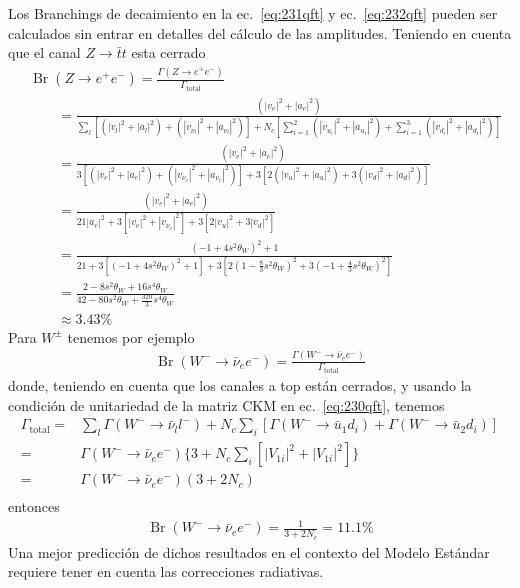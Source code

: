 Los Branchings de decaimiento en la ec.~\eqref{eq:231qft} y ec.~\eqref{eq:232qft}  pueden ser calculados sin entrar en detalles del cálculo de las amplitudes. Teniendo en cuenta que el canal $Z\to\bar{t}t$ esta cerrado
\begin{align}
  &\operatorname{Br}(Z\to e^+e^-)=\frac{\Gamma(Z\to e^+e^-)}{\Gamma_{\text{total}}}\nonumber\\
 &\qquad=\frac{(|v_e|^2+|a_e|^2)}{\sum_l[(|v_l|^2+|a_l|^2)+(|v_{\nu_l}|^2+|a_{\nu_l}|^2)]
+N_c[\sum_{i=1}^2(|v_{u_i}|^2+|a_{u_i}|^2)+\sum_{i=1}^3(|v_{d_i}|^2+|a_{d_i}|^2)]}\nonumber\\
 &\qquad=\frac{(|v_e|^2+|a_e|^2)}{3[(|v_e|^2+|a_e|^2)+(|v_{\nu_e}|^2+|a_{\nu_e}|^2)]
+3[2(|v_{u}|^2+|a_{u}|^2)+3(|v_{d}|^2+|a_{d}|^2)]}\nonumber\\
  &\qquad=\frac{(|v_e|^2+|a_e|^2)}{21|a_e|^2+3[|v_e|^2+|v_{\nu_e}|^2]
+3[2|v_{u}|^2+3|v_{d}|^2]}\nonumber\\
 &\qquad=\frac{(-1+4s^2\theta_W)^2+1}{21+3[(-1+4s^2\theta_W)^2+1]
+3[2(1-\frac{8}{3}s^2\theta_W)^2+3(-1+\frac{4}{3}s^2\theta_W)^2]}\nonumber\\
  &\qquad=\frac{2-8s^2\theta_W+16s^4\theta_W}{42-80s^2\theta_W+\frac{320}{3}s^4\theta_W}\nonumber\\
&\qquad\approx3.43\%
\end{align}
Para $W^\pm$ tenemos por ejemplo
\begin{align}
\operatorname{Br}(W^-\to\bar{\nu}_e e^-)=\frac{\Gamma(W^-\to\bar{\nu}_e e^-)}{\Gamma_{\text{total}}}
\end{align}
donde, teniendo en cuenta que los canales a top están cerrados, y usando la condición de unitariedad de la matriz CKM en ec.~\eqref{eq:230qft}, tenemos
\begin{align}
  \Gamma_{\text{total}}=&\sum_l\Gamma(W^-\to\bar{\nu}_l l^-)+N_c\sum_i[\Gamma(W^-\to\bar{u}_1d_i)+\Gamma(W^-\to\bar{u}_2d_i)]\nonumber\\
  =&\Gamma(W^-\to\bar{\nu}_e e^-)\{3+N_c\sum_i[|V_{1i}|^2+|V_{1i}|^2]\} \nonumber\\
  =&\Gamma(W^-\to\bar{\nu}_e e^-)(3+2N_c) \nonumber\\
\end{align}
entonces
\begin{align}
  \operatorname{Br}(W^-\to\bar{\nu}_e e^-)=\frac{1}{3+2N_c}=11.1\%
\end{align}
Una mejor predicción de dichos resultados en el contexto del Modelo Estándar requiere tener en cuenta las correcciones radiativas.


